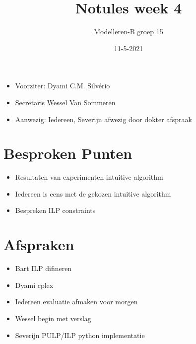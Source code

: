 \documentclass{article}
\title{Notules week 4}
\author{Modelleren-B groep 15}
\date{11-5-2021}
\begin{document}
\maketitle


\begin{itemize}
    \item Voorziter: Dyami C.M. Silvério 
    \item Secretaris Wessel Van Sommeren
    \item Aanwezig: Iedereen, Severijn afwezig door dokter afspraak
\end{itemize}

\section{Besproken Punten}
\begin{itemize}
    \item Resultaten van experimenten intuitive algorithm
    \item Iedereen is eens met de gekozen intuitive algorithm
    \item Bespreken ILP constraints
\end{itemize}

\section{Afspraken}
\begin{itemize}
    \item Bart ILP difineren 
    \item Dyami cplex
    \item Iedereen evaluatie afmaken voor morgen
    \item Wessel begin met verslag
    \item Severijn PULP/ILP python implementatie
\end{itemize}
\end{document}
